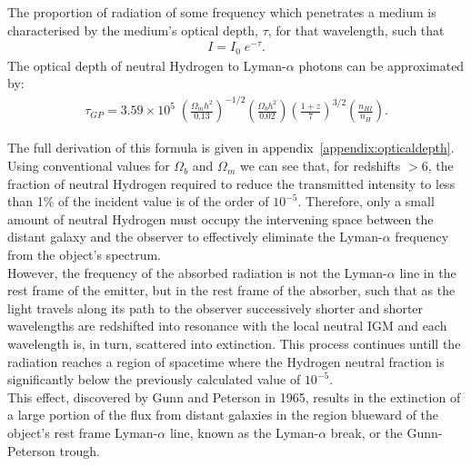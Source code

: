 \documentclass[pdf,color]{UoBnote}
\begin{document}
The proportion of radiation of some frequency which penetrates a medium is characterised by the medium's optical depth, $\tau$, for that wavelength, such that
\begin{align}
			I = I_0 \; e^{-\tau}.
\end{align}
The optical depth of neutral Hydrogen to Lyman-$\alpha$ photons can be approximated by:
\begin{align}
			\tau_{GP} = 3.59 \times 10^5 \; \left ( 	\frac{\Omega_m h^2}{0.13}	\right ) ^{-1/2}	
								\left ( 	\frac{\Omega_b h^2}{0.02}	\right ) 	
								\left ( 	\frac{1+z}{7}			\right )^{3/2} 	
								\left ( 	\frac{n_{HI}}{n_H}			\right ) .
\end{align}		%

The full derivation of this formula is given in appendix~\ref{appendix:opticaldepth}. \\

Using conventional values for $\Omega_b$ and $\Omega_m$ we can see that, for redshifts $>$6, the fraction of neutral Hydrogen required to reduce the transmitted intensity to less than 1\% of the incident value is of the order of $10^{-5}$. Therefore, only a small amount of neutral Hydrogen must occupy the intervening space between the distant galaxy and the observer to effectively eliminate the Lyman-$\alpha$ frequency from the object's spectrum. \\

However, the frequency of the absorbed radiation is not the Lyman-$\alpha$ line in the rest frame of the emitter, but in the rest frame of the absorber, such that as the light travels along its path to the observer successively shorter and shorter wavelengths are redshifted into resonance with the local neutral IGM and each wavelength is, in turn, scattered into extinction. This process continues untill the radiation reaches a region of spacetime where the Hydrogen neutral fraction is significantly below the previously calculated value of $10^{-5}$. \\

This effect, discovered by Gunn and Peterson in 1965, results in the extinction of a large portion of the flux from distant galaxies in the region blueward of the object's rest frame  Lyman-$\alpha$ line, known as the Lyman-$\alpha$ break, or the Gunn-Peterson trough. \\
\end{document}
